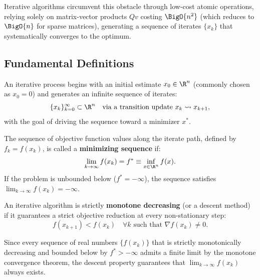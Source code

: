 Iterative algorithms circumvent this obstacle through low-cost atomic operations, relying solely on matrix-vector products $Q v$ costing $\BigO{n^2}$ (which reduces to $\BigO{n}$ for sparse matrices), generating a sequence of iterates $\{x_k\}$ that systematically converges to the optimum.

\subsection{Fundamental Definitions}

\begin{definition}
An iterative process begins with an initial estimate $x_0 \in \R^n$ (commonly chosen as $x_0 = 0$) and generates an infinite sequence of iterates:
\begin{equation}
    \{x_k\}_{k=0}^\infty \subset \R^n \quad \text{via a transition update } x_k \rightsquigarrow x_{k+1},
\end{equation}
with the goal of driving the sequence toward a minimizer $x^*$.
\end{definition}

\begin{definition}
The sequence of objective function values along the iterate path, defined by $f_k = f(x_k)$, is called a \textbf{minimizing sequence} if:
\begin{equation}
    \lim_{k \to \infty} f(x_k) = f^* \equiv \inf_{x \in \R^n} f(x).
\end{equation}
If the problem is unbounded below ($f^* = -\infty$), the sequence satisfies $\lim_{k \to \infty} f(x_k) = -\infty$.
\end{definition}

\begin{definition}
An iterative algorithm is strictly \textbf{monotone decreasing} (or a descent method) if it guarantees a strict objective reduction at every non-stationary step:
\begin{equation}
    f(x_{k+1}) < f(x_k) \quad \forall k \text{ such that } \nabla f(x_k) \neq 0.
\end{equation}
\end{definition}

\begin{proposition}
Since every sequence of real numbers $\{f(x_k)\}$ that is strictly monotonically decreasing and bounded below by $f^* > -\infty$ admits a finite limit by the monotone convergence theorem, the descent property guarantees that $\lim_{k \to \infty} f(x_k)$ always exists.
\end{proposition}


